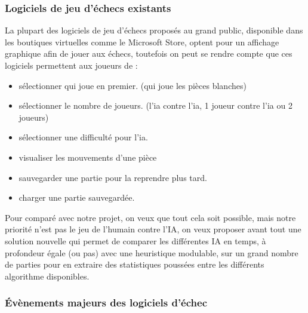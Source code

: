 \huge\documentclass{article}
\begin{document}
    \subsubsection{Logiciels de jeu d'échecs existants}

    La plupart des logiciels de jeu d'échecs proposés au grand public, disponible dans les boutiques virtuelles comme le Microsoft Store, optent pour un affichage graphique afin de jouer aux échecs, toutefois on peut se rendre compte que ces logiciels permettent aux joueurs de :

    \begin{itemize}
        \item sélectionner qui joue en premier. (qui joue les pièces blanches)
        \item sélectionner le nombre de joueurs. (l'ia contre l'ia, 1 joueur contre l'ia ou 2 joueurs)
        \item sélectionner une difficulté pour l'ia.
        \item visualiser les mouvements d'une pièce
        \item sauvegarder une partie pour la reprendre plus tard.
        \item charger une partie sauvegardée.
        \newline\newline
    \end{itemize}

    Pour comparé avec notre projet, on veux que tout cela soit possible, mais notre priorité n'est pas le jeu de l'humain contre l'IA, on veux proposer avant tout une solution nouvelle qui permet de comparer les différentes IA en temps, à profondeur égale (ou pas) avec une heuristique modulable, sur un grand nombre de parties pour en extraire des statistiques poussées entre les différents algorithme disponibles.
    \newline

    \subsubsection{Évènements majeurs des logiciels d'échec}
\end{document}
